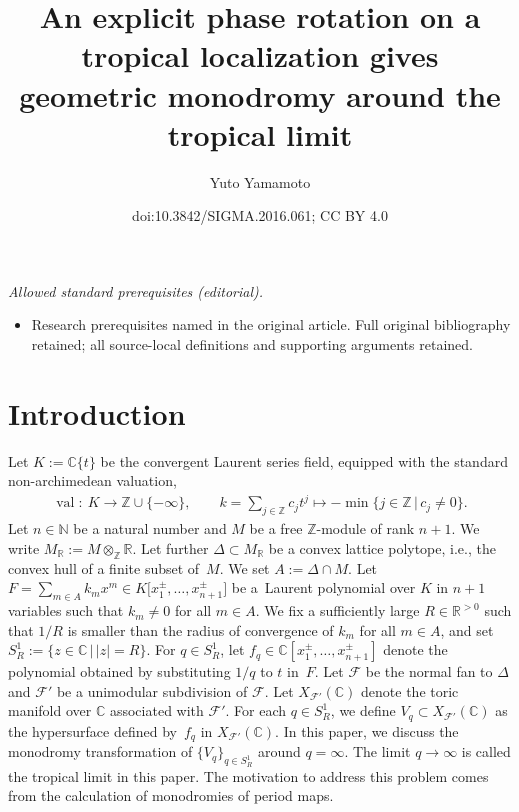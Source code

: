 \documentclass[10pt,a4paper]{amsart}
\title{An explicit phase rotation on a tropical localization gives geometric monodromy around the tropical limit}
\author{Yuto Yamamoto}
\date{doi:10.3842/SIGMA.2016.061; CC BY 4.0}
\numberwithin{equation}{section}
\begin{document}
\maketitle
\noindent\textit{Allowed standard prerequisites (editorial).}\begin{itemize}
\item Research prerequisites named in the original article. Full original bibliography retained; all source-local definitions and supporting arguments retained.
\end{itemize}\medskip
\section{Introduction}

Let $K := {\mathbb C}\{t\}$ be the convergent Laurent series f\/ield, equipped with the standard non-archi\-me\-dean valuation,
\begin{gather}\label{eq:val}
\operatorname{val} \colon \ K \longrightarrow {\mathbb Z} \cup \{ - \infty \},\qquad k=\sum_{j \in {\mathbb Z}}c_j t^j \mapsto - \min \{ j \in {\mathbb Z} \,|\, c_j \ne 0 \}.
\end{gather}
Let $n \in {\mathbb N}$ be a natural number and $M$ be a free ${\mathbb Z}$-module of rank $n+1$. We write $M_{\mathbb R}:=M \otimes_{\mathbb Z} {\mathbb R}$.
Let further $\Delta \subset M_{\mathbb R}$ be a convex lattice polytope, i.e., the convex hull of a f\/inite subset of~$M$. We set $A:= \Delta \cap M$.
Let $F=\sum\limits_{m \in A} k_m x^m \in K\big[x^\pm_{1},\dots,x^\pm_{n+1}\big]$ be a~Laurent polynomial over $K$ in $n+1$ variables such that $k_m \neq 0$ for all $m \in A$. We f\/ix a suf\/f\/iciently large $R \in {\mathbb R}^{>0}$ such that $1/R$ is smaller than the radius of convergence of $k_m$ for all $m \in A$, and set $S_R^1 := \{ z \in {\mathbb C} \,|\, |z|=R \}$. For $q \in S_R^1$, let $f_q \in {\mathbb C}[x^\pm_{1},\dots,x^\pm_{n+1}]$ denote the polynomial obtained by substituting $1/q$ to $t$ in~$F$. Let ${\mathcal F}$ be the normal fan to $\Delta$ and ${\mathcal F}'$ be a unimodular subdivision of ${\mathcal F}$. Let $X_{{\mathcal F}'}({\mathbb C})$ denote the toric manifold over ${\mathbb C}$ associated with ${\mathcal F}'$. For each $q \in S_R^1$, we def\/ine $V_q \subset X_{{\mathcal F}'}({\mathbb C})$ as the hypersurface def\/ined by~$f_q$ in $X_{{\mathcal F}'}({\mathbb C})$. In this paper, we discuss the monodromy transformation of $\{V_q\}_{q \in S_R^1}$ around $q=\infty$. The limit $q \to \infty$ is called the tropical limit in this paper. The motivation to address this problem comes from the calculation of monodromies of period maps.
\end{document}
